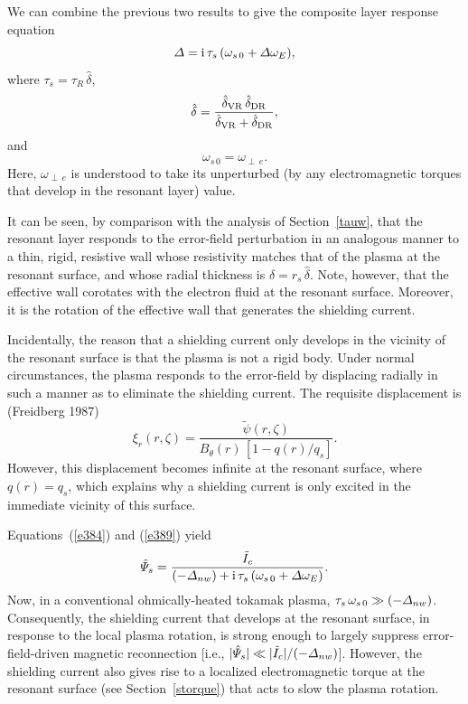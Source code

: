 \documentclass[notitlepage,12pt]{article}
\begin{document}
We can combine the previous two results to give the composite layer response equation
\begin{equation}\label{e389}
{\mit\Delta} = {\rm i}\,\tau_s\,(\omega_{s\,0}+ {\mit\Delta}\omega_E),
\end{equation}
where $\tau_s=\tau_R\,\hat{\delta}$, 
\begin{equation}
\hat{\delta} = \frac{\hat{\delta}_{\rm VR}\,\hat{\delta}_{\rm DR}}{\hat{\delta}_{\rm VR} + \hat{\delta}_{\rm DR}},
\end{equation}
and 
\begin{equation}
\omega_{s\,0}= \omega_{\perp\,e}.
\end{equation} 
Here, $\omega_{\perp\,e}$ is understood to take its unperturbed (by any electromagnetic torques that
develop in the resonant layer) value. 

It can be seen, by comparison with the analysis of Section~\ref{tauw}, that the resonant layer responds to the error-field
perturbation in an analogous manner to a thin, rigid, resistive wall whose resistivity matches that of the plasma at the
resonant surface, and whose radial thickness is $\delta=r_s\,\hat{\delta}$. Note, however, that the effective wall corotates with the
electron fluid at the resonant surface. Moreover, it is the rotation of the effective wall that generates the shielding current. 

Incidentally, the reason that a shielding current only develops in the vicinity of the resonant surface is that the plasma is
not a rigid body. Under normal circumstances, the plasma responds to the error-field by displacing radially in such a
manner as to eliminate the shielding current. The requisite displacement is (Freidberg 1987)
\begin{equation}
\xi_r(r,\zeta) = \frac{\tilde{\psi}(r,\zeta)}{B_\theta(r)\,[1-q(r)/q_s]}.
\end{equation}
However, this displacement becomes infinite at the resonant surface, where $q(r)=q_s$, which explains why a shielding
current is only excited in the immediate vicinity of this surface. 

Equations~(\ref{e384}) and (\ref{e389}) yield
\begin{equation}\label{e392}
\hat{\mit\Psi}_s=\frac{\tilde{I}_c}{(-{\mit\Delta}_{nw})+ {\rm i}\,\tau_s\,(\omega_{s\,0}+ {\mit\Delta}\omega_E)}.
\end{equation}
Now, in a conventional ohmically-heated tokamak plasma, $\tau_s\,\omega_{s\,0}\gg (-{\mit\Delta}_{nw})$. Consequently, the
shielding current that develops at the resonant surface, in response to the local plasma rotation, is strong enough to largely
suppress error-field-driven magnetic reconnection [i.e., $|\hat{\mit\Psi}_s|\ll |\tilde{I}_c|/(-{\mit\Delta}_{nw})$]. However, the shielding current also gives rise to a localized electromagnetic
torque at the resonant surface (see Section~\ref{storque}) that acts to slow the plasma rotation. 
\end{document}
